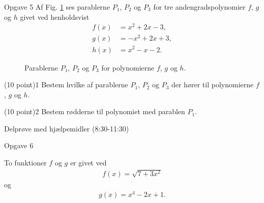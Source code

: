 \documentclass[12pt,x11names,a4paper]{article}
\begin{document}
\begin{opgavetekst}{Opgave 5}
Af Fig. \ref{fig:polys} ses parablerne $P_1$, $P_2$ og $P_3$ for tre andengradspolynomier $f$, $g$ og $h$ givet ved henholdsvist
\begin{align*}
f(x) &= x^2 + 2x -3,\\
g(x) &= -x^2 + 2x + 3,\\
h(x) &= x^2-x-2.
\end{align*}
\begin{figure}[H]
\centering
{}
\caption{Parablerne $P_1$, $P_2$ og $P_3$ for polynomierne $f$, $g$ og $h$. }
\label{fig:polys}
\end{figure}
\phantom{h}
\end{opgavetekst}

\begin{delopgave}{\colorbox{NorregGroen!40}{(10 point)}}{1}
	Bestem hvilke af parablerne $P_1$, $P_2$ og $P_3$ der hører til polynomierne $f$, $g$ og $h$. 
\end{delopgave}

\begin{delopgave}{(10 point)}{2}
	Bestem rødderne til polynomiet med parablen $P_1$. 
\end{delopgave}

\newpage
\begin{center}
\LARGE
Delprøve med hjælpemidler (8:30-11:30)
\end{center}


\begin{opgavetekst}{Opgave 6}

To funktioner $f$ og $g$ er givet ved 
\begin{align*}
f(x) = \sqrt{7+3x^2}
\end{align*}
og
\begin{align*}
g(x) = x^4-2x+1.
\end{align*}
\end{opgavetekst}
\end{document}
